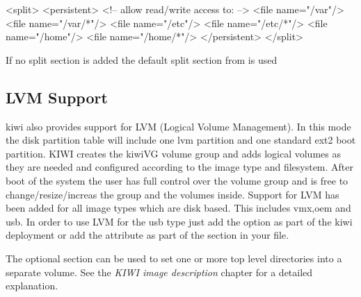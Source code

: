 \begin{xml}
<split>
   <persistent>
      <!-- allow read/write access to: -->
      <file name="/var"/>
      <file name="/var/*"/>
      <file name="/etc"/>
      <file name="/etc/*"/>
      <file name="/home"/>
      <file name="/home/*"/>
   </persistent>
</split>
\end{xml}

If no split section is added the default split section from
 is used

\subsection{LVM Support}
kiwi also provides support for LVM (Logical Volume Management). In this
mode the disk partition table will include one lvm partition and one
standard ext2 boot partition. KIWI creates the kiwiVG volume group and
adds logical volumes as they are needed and configured according to the
image type and filesystem. After boot of the system the user has full
control over the volume group and is free to change/resize/increas the
group and the volumes inside. Support for LVM has been added for all
image types which are disk based. This includes vmx,oem and usb.
In order to use LVM for the usb type just add the  option
as part of the kiwi   deployment or add the
attribute  as part of the  section
in your  file.

The optional  section can be used to set one or
more top level directories into a separate volume. See the
\textit{KIWI image description} chapter for a detailed explanation.

